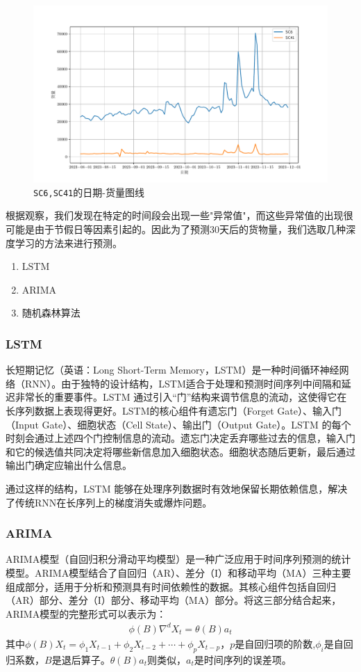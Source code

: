 \documentclass[UTF8,a4paper,10 pt]{article}%
\begin{document}
\begin{figure}[!ht]
	\centering
	\includegraphics*[width=0.8\linewidth]{images/example.pdf}
	\caption{{\tt SC6,SC41}的日期-货量图线}
\end{figure}

根据观察，我们发现在特定的时间段会出现一些"异常值"，而这些异常值的出现很可能是由于节假日等因素引起的。因此为了预测30天后的货物量，我们选取几种深度学习的方法来进行预测。
\begin{enumerate}
	\item LSTM
	\item ARIMA
	\item 随机森林算法
\end{enumerate}
\subsubsection{LSTM}
长短期记忆（英语：Long Short-Term Memory，LSTM）是一种时间循环神经网络（RNN）。由于独特的设计结构，LSTM适合于处理和预测时间序列中间隔和延迟非常长的重要事件。LSTM 通过引入“门”结构来调节信息的流动，这使得它在长序列数据上表现得更好。LSTM的核心组件有遗忘门（Forget Gate）、输入门（Input Gate）、细胞状态（Cell State）、输出门（Output Gate）。LSTM 的每个时刻会通过上述四个门控制信息的流动。遗忘门决定丢弃哪些过去的信息，输入门和它的候选值共同决定将哪些新信息加入细胞状态。细胞状态随后更新，最后通过输出门确定应输出什么信息。

通过这样的结构，LSTM 能够在处理序列数据时有效地保留长期依赖信息，解决了传统RNN在长序列上的梯度消失或爆炸问题。

\subsubsection{ARIMA}
ARIMA模型（自回归积分滑动平均模型）是一种广泛应用于时间序列预测的统计模型。ARIMA模型结合了自回归（AR）、差分（I）和移动平均（MA）三种主要组成部分，适用于分析和预测具有时间依赖性的数据。其核心组件包括自回归（AR）部分、差分（I）部分、移动平均（MA）部分。将这三部分结合起来，ARIMA模型的完整形式可以表示为：
\begin{align*}
	\phi (B)\nabla^d X_t = \theta(B)a_t
\end{align*}
其中\(\phi (B) X_t = \phi_1X_{t-1}+\phi_2X_{t-2}+\cdots+\phi_p X_{t-p}\)，$p$是自回归项的阶数,\(\phi_i\)是自回归系数，\(B\)是退后算子。\(\theta(B) 	a_t\)则类似，\(a_t\)是时间序列的误差项。
\end{document}
